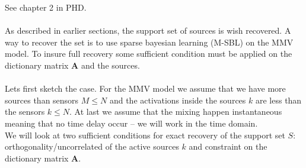 
See chapter 2 in PHD.
\\ \\
As described in earlier sections, the support set of sources is wish recovered. A way to recover the set is to use sparse bayesian learning (M-SBL) on the MMV model. To insure full recovery some sufficient condition must be applied on the dictionary matrix $\mathbf{A}$ and the sources. 
\\ \\
Lets first sketch the case. For the MMV model we assume that we have more sources than sensors $M \leq N$ and the activations inside the sources $k$ are less than the sensors $k \leq N$. At last we assume that the mixing happen instantaneous meaning that no time delay occur -- we will work in the time domain.
\\
We will look at two sufficient conditions for exact recovery of the support set $S$: orthogonality/uncorrelated of the active sources $k$ and constraint on the dictionary matrix $\mathbf{A}$.

